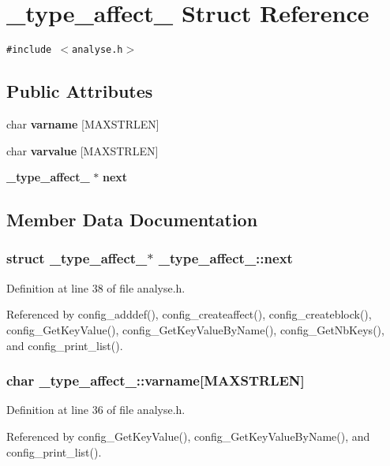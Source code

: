 \section{\_\-type\_\-affect\_\- Struct Reference}
\label{struct__type__affect__}
{\tt \#include $<$analyse.h$>$}

\subsection*{Public Attributes}
\begin{CompactItemize}
\item 
char {\bf varname} [MAXSTRLEN]
\item 
char {\bf varvalue} [MAXSTRLEN]
\item 
{\bf \_\-type\_\-affect\_\-} $\ast$ {\bf next}
\end{CompactItemize}


\subsection{Member Data Documentation}
\subsubsection{\setlength{\rightskip}{0pt plus 5cm}struct {\bf \_\-type\_\-affect\_\-}$\ast$ {\bf \_\-type\_\-affect\_\-::next}}\label{struct__type__affect___o2}




Definition at line 38 of file analyse.h.

Referenced by config\_\-adddef(), config\_\-createaffect(), config\_\-createblock(), config\_\-Get\-Key\-Value(), config\_\-Get\-Key\-Value\-By\-Name(), config\_\-Get\-Nb\-Keys(), and config\_\-print\_\-list().
\subsubsection{\setlength{\rightskip}{0pt plus 5cm}char {\bf \_\-type\_\-affect\_\-::varname}[MAXSTRLEN]}\label{struct__type__affect___o0}




Definition at line 36 of file analyse.h.

Referenced by config\_\-Get\-Key\-Value(), config\_\-Get\-Key\-Value\-By\-Name(), and config\_\-print\_\-list().
